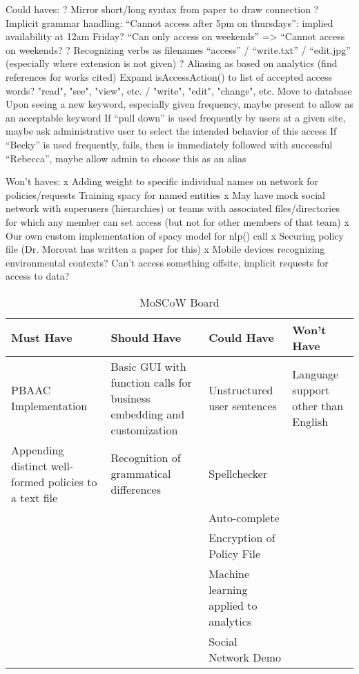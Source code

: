 \documentclass[12pt]{article}
\begin{document}
Could haves:
? Mirror short/long syntax from paper to draw connection
? Implicit grammar handling:
“Cannot access after 5pm on thursdays”: implied availability at 12am Friday?
“Can only access on weekends” => “Cannot access on weekends?
?  Recognizing verbs as filenames “access” / “write.txt” / “edit.jpg” (especially where extension is not given)
?  Aliasing as based on analytics (find references for works cited)
Expand isAccessAction() to list of accepted access words?
"read", "see", "view", etc. / "write", "edit", "change", etc.
Move to database
Upon seeing a new keyword, especially given frequency, maybe present to allow as an acceptable keyword
If “pull down” is used frequently by users at a given site, maybe ask administrative user to select the intended behavior of this access
If “Becky” is used frequently, fails, then is immediately followed with successful “Rebecca”, maybe allow admin to choose this as an alias

Won't haves:
x  Adding weight to specific individual names on network for policies/requests
Training spacy for named entities
x  May have mock social network with superusers (hierarchies) or teams with associated files/directories for which any member can set access (but not for other members of that team)
x  Our own custom implementation of spacy model for nlp() call
x  Securing policy file (Dr. Morovat has written a paper for this)
x  Mobile devices recognizing environmental contexts?
Can’t access something offsite, implicit requests for access to data?

\begin{table}[p]
    \begin{center}
        \begin{tabular}{ | m{1.3in} | m{1.3in}| m{1.3in} | m{1.3in} | } 
        \hline
        Must Have & Should Have & Could Have & Won't Have \\ 
        \hline
        \hline
        PBAAC Implementation & Basic GUI with function calls for business embedding and customization & Unstructured user sentences & Language support other than English \\ 
        \hline
        Appending distinct well-formed policies to a text file & Recognition of grammatical differences & Spellchecker &   \\ 
        \hline
          &   & Auto-complete &   \\ 
        \hline
          &   & Encryption of Policy File &   \\ 
        \hline
          &   & Machine learning applied to analytics &   \\ 
        \hline
          &   & Social Network Demo &   \\ 
        \hline
        \end{tabular}
        \caption{MoSCoW Board}
        \label{table:1}
    \end{center}
\end{table}
\end{document}
